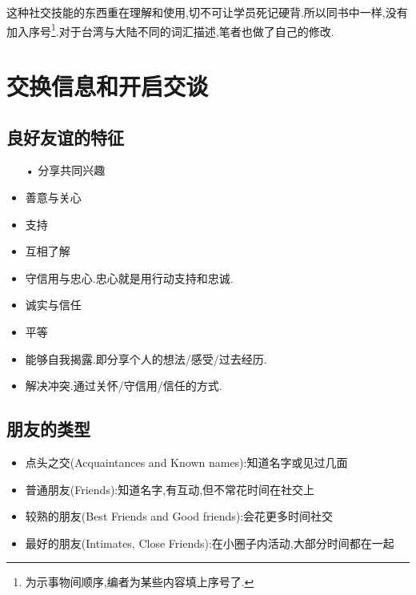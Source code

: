 \documentclass[UTF8]{article}
\newcommand{\indList}{\vspace{-6pt}}
\newcommand{\Dot}{•}
\begin{document}
这种社交技能的东西重在理解和使用,切不可让学员死记硬背.所以同书中一样,没有加入序号\footnote{为示事物间顺序,编者为某些内容填上序号了.}.对于台湾与大陆不同的词汇描述,笔者也做了自己的修改.

\tableofcontents

\newpage
\section{交换信息和开启交谈}

\subsection{良好友谊的特征\label{1.1}}
\indList
\begin{itemize}
    \item[\Dot] 分享共同兴趣
    \item 善意与关心
    \item 支持
    \item 互相了解
    \item 守信用与忠心.忠心就是用行动支持和忠诚.
    \item 诚实与信任
    \item 平等
    \item 能够自我揭露.即分享个人的想法/感受/过去经历.
    \item 解决冲突.通过关怀/守信用/信任的方式.
\end{itemize}
\indList

\subsection{朋友的类型\label{1.2}}
\indList
\begin{itemize}
    \item 点头之交(Acquaintances and Known names):知道名字或见过几面
    \item 普通朋友(Friends):知道名字,有互动,但不常花时间在社交上
    \item 较熟的朋友(Best Friends and Good friends):会花更多时间社交
    \item 最好的朋友(Intimates, Close Friends):在小圈子内活动,大部分时间都在一起
\end{itemize}
\indList
\end{document}

